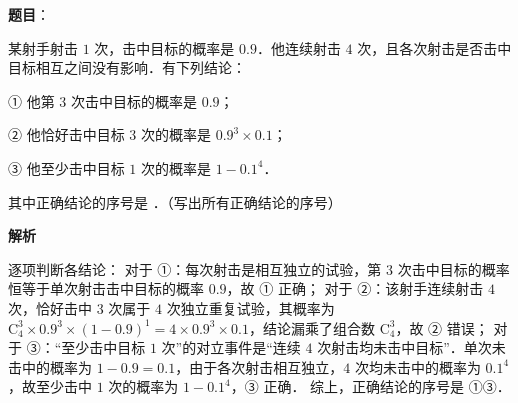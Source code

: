 \begin{answer}

\textbf{题目}：

某射手射击 $1$ 次，击中目标的概率是 $0.9$．他连续射击 $4$ 次，且各次射击是否击中目标相互之间没有影响．有下列结论：

① 他第 $3$ 次击中目标的概率是 $0.9$；

② 他恰好击中目标 $3$ 次的概率是 $0.9^3 \times 0.1$；

③ 他至少击中目标 $1$ 次的概率是 $1 - 0.1^4$．

其中正确结论的序号是 \underline{\hspace{3cm}}．（写出所有正确结论的序号）

\textbf{解析}

逐项判断各结论：
对于 ①：每次射击是相互独立的试验，第 $3$ 次击中目标的概率恒等于单次射击击中目标的概率 $0.9$，故 ① 正确；
对于 ②：该射手连续射击 $4$ 次，恰好击中 $3$ 次属于 $4$ 次独立重复试验，其概率为 $\mathrm{C}_4^3 \times 0.9^3 \times (1 - 0.9)^1 = 4 \times 0.9^3 \times 0.1$，结论漏乘了组合数 $\mathrm{C}_4^3$，故 ② 错误；
对于 ③：“至少击中目标 $1$ 次”的对立事件是“连续 $4$ 次射击均未击中目标”．单次未击中的概率为 $1 - 0.9 = 0.1$，由于各次射击相互独立，$4$ 次均未击中的概率为 $0.1^4$，故至少击中 $1$ 次的概率为 $1 - 0.1^4$，③ 正确．
综上，正确结论的序号是 ①③．


\end{answer}
